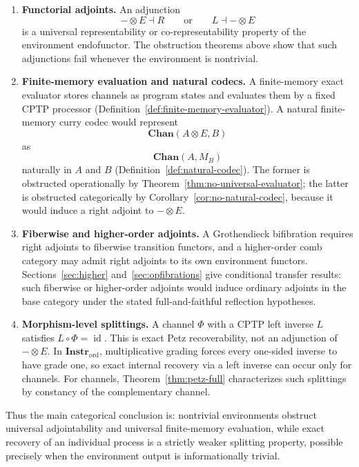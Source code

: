 \documentclass[11pt]{article}
\DeclareMathOperator{\id}{id}
\begin{document}
\begin{enumerate}
\item \textbf{Functorial adjoints.} An adjunction
\[
-\otimes E\dashv R
\qquad\text{or}\qquad
L\dashv-\otimes E
\]
is a universal representability or co-representability property of the
environment endofunctor. The obstruction theorems above show that such
adjunctions fail whenever the environment is nontrivial.

\item \textbf{Finite-memory evaluation and natural codecs.} A
finite-memory exact evaluator stores channels as program states and
evaluates them by a fixed CPTP processor
(Definition~\ref{def:finite-memory-evaluator}). A natural finite-memory
curry codec would represent
\[
\mathbf{Chan}(A\otimes E,B)
\]
as
\[
\mathbf{Chan}(A,M_B)
\]
naturally in $A$ and $B$ (Definition~\ref{def:natural-codec}). The former
is obstructed operationally by
Theorem~\ref{thm:no-universal-evaluator}; the latter is obstructed
categorically by Corollary~\ref{cor:no-natural-codec}, because it would
induce a right adjoint to $-\otimes E$.

\item \textbf{Fiberwise and higher-order adjoints.} A Grothendieck
bifibration requires right adjoints to fiberwise transition functors, and a
higher-order comb category may admit right adjoints to its own environment
functors. Sections~\ref{sec:higher} and~\ref{sec:opfibrations} give
conditional transfer results: such fiberwise or higher-order adjoints would
induce ordinary adjoints in the base category under the stated
full-and-faithful reflection hypotheses.

\item \textbf{Morphism-level splittings.} A channel $\Phi$ with a CPTP
left inverse $L$ satisfies $L\circ\Phi=\id$. This is exact Petz
recoverability, not an adjunction of $-\otimes E$. In
$\mathbf{Instr}_{\mathrm{ord}}$, multiplicative grading forces every
one-sided inverse to have grade one, so exact internal recovery via a left
inverse can occur only for channels. For channels,
Theorem~\ref{thm:petz-full} characterizes such splittings by constancy of
the complementary channel.
\end{enumerate}

Thus the main categorical conclusion is: nontrivial environments obstruct
universal adjointability and universal finite-memory evaluation, while exact
recovery of an individual process is a strictly weaker splitting property,
possible precisely when the environment output is informationally trivial.
\end{document}
